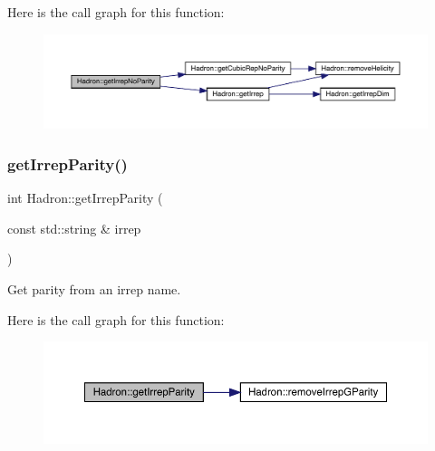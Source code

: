 Here is the call graph for this function\+:
\nopagebreak
\begin{figure}[H]
\begin{center}
\leavevmode
\includegraphics[width=350pt]{d1/daf/namespaceHadron_ae2543483bce4c1e4b6c9ca56d01fe9ac_cgraph}
\end{center}
\end{figure}
\mbox{\label{namespaceHadron_af182dccf3462f82247a3d86df38c2da0}} 
\subsubsection{\texorpdfstring{getIrrepParity()}{getIrrepParity()}}
{\footnotesize\ttfamily int Hadron\+::get\+Irrep\+Parity (\begin{DoxyParamCaption}\item[{const std\+::string \&}]{irrep }\end{DoxyParamCaption})}



Get parity from an irrep name. 

Here is the call graph for this function\+:
\nopagebreak
\begin{figure}[H]
\begin{center}
\leavevmode
\includegraphics[width=350pt]{d1/daf/namespaceHadron_af182dccf3462f82247a3d86df38c2da0_cgraph}
\end{center}
\end{figure}
\mbox{\label{namespaceHadron_a0f40c5d7e590d17294e0a27e231c0a4b}} 
